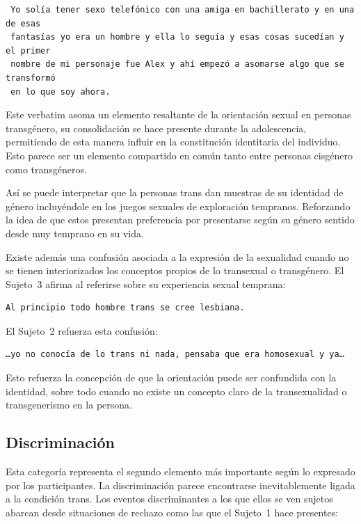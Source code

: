 \begin{verbatim}
 Yo solía tener sexo telefónico con una amiga en bachillerato y en una de esas
 fantasías yo era un hombre y ella lo seguía y esas cosas sucedían y el primer
 nombre de mi personaje fue Alex y ahí empezó a asomarse algo que se transformó
 en lo que soy ahora.
\end{verbatim}

Este verbatim asoma un elemento resaltante de la orientación sexual en personas
transgénero, su consolidación se hace presente durante la adolescencia,
permitiendo de esta manera influir en la constitución identitaria del individuo.
Esto parece ser un elemento compartido en común tanto entre personas cisgénero
como transgéneros.

Así se puede interpretar que la personas trans dan muestras de su identidad de
género incluyéndole en los juegos sexuales de exploración tempranos. Reforzando
la idea de que estos presentan preferencia por presentarse según su género
sentido desde muy temprano en su vida.

Existe además una confusión asociada a la expresión de la sexualidad cuando no
se tienen interiorizados los conceptos propios de lo transexual o transgénero.
El Sujeto~3 afirma al referirse sobre su experiencia sexual temprana:

\begin{verbatim}
Al principio todo hombre trans se cree lesbiana.
\end{verbatim}

El Sujeto~2 refuerza esta confusión:

\begin{verbatim}
…yo no conocía de lo trans ni nada, pensaba que era homosexual y ya…
\end{verbatim}

Esto refuerza la concepción de que la orientación puede ser confundida con la
identidad, sobre todo cuando no existe un concepto claro de la transexualidad o
transgenerismo en la persona.

\subsection{Discriminación}

Esta categoría representa el segundo elemento más importante según lo expresado
por los participantes. La discriminación parece encontrarse inevitablemente
ligada a la condición trans. Los eventos discriminantes a los que ellos se ven
sujetos abarcan desde situaciones de rechazo como las que el Sujeto~1 hace
presentes:

